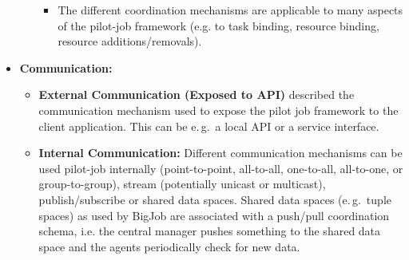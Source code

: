 \documentclass[conference,final]{IEEEtran}
\begin{document}
\begin{itemize}
\begin{itemize}
\begin{itemize}
     			\item The different coordination mechanisms are applicable to many 
     			aspects of the pilot-job framework 
     			(e.g. to task binding, resource binding, resource 
     			additions/removals).    		
     		\end{itemize}
     \end{itemize}
	 

	\item \textbf{Communication:}
	\begin{itemize}
        \item \textbf{External Communication (Exposed to API)} described the 
        communication 
        mechanism used to expose the pilot job framework to the client 
        application.  This can be e.\,g.\ a local API or a service interface.
        \item \textbf{Internal Communication:} Different communication 
               	mechanisms can be used pilot-job  internally  (point-to-point, 
               	all-to-all, one-to-all, all-to-one, or group-to-group),
                stream (potentially unicast or multicast), publish/subscribe or      
                shared data spaces. Shared data spaces (e.\,g.\ tuple spaces) as 
                used by BigJob are associated with a push/pull coordination 
                schema, i.e. the central manager pushes something to the shared 
                data space and the agents 
                periodically check for new data.
	\end{itemize}
		

\end{itemize}
\end{document}
